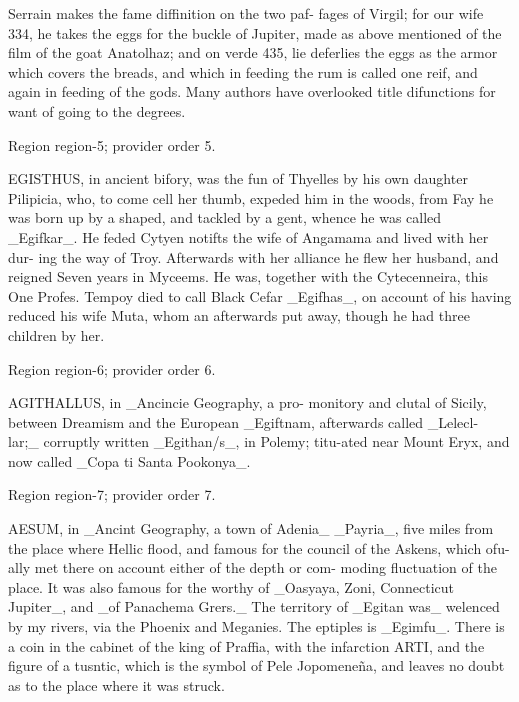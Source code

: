\documentclass[11pt]{article}
\begin{document}
Serrain makes the fame diffinition on the two paf- fages of Virgil; for our wife 334, he takes the eggs for the buckle of Jupiter, made as above mentioned of the film of the goat Anatolhaz; and on verde 435, lie deferlies the eggs as the armor which covers the breads, and which in feeding the rum is called one reif, and again in feeding of the gods. Many authors have overlooked title difunctions for want of going to the degrees.
\par

{\scriptsize\color{gray} Region region-5; provider order 5.\par}
\medskip

EGISTHUS, in ancient bifory, was the fun of Thyelles by his own daughter Pilipicia, who, to come cell her thumb, expeded him in the woods, from Fay he was born up by a shaped, and tackled by a gent, whence he was called \_Egifkar\_. He feded Cytyen notifts the wife of Angamama and lived with her dur- ing the way of Troy. Afterwards with her alliance he flew her husband, and reigned Seven years in Myceems. He was, together with the Cytecenneira, this One Profes. Tempoy died to call Black Cefar \_Egifhas\_, on account of his having reduced his wife Muta, whom an afterwards put away, though he had three children by her.
\par

{\scriptsize\color{gray} Region region-6; provider order 6.\par}
\medskip

AGITHALLUS, in \_Ancincie Geography, a pro- monitory and clutal of Sicily, between Dreamism and the European \_Egiftnam, afterwards called \_Lelecl- lar;\_ corruptly written \_Egithan/s\_, in Polemy; titu-ated near Mount Eryx, and now called \_Copa ti Santa Pookonya\_.
\par

{\scriptsize\color{gray} Region region-7; provider order 7.\par}
\medskip

AESUM, in \_Ancint Geography, a town of Adenia\_ \_Payria\_, five miles from the place where Hellic flood, and famous for the council of the Askens, which ofu- ally met there on account either of the depth or com- moding fluctuation of the place. It was also famous for the worthy of \_Oasyaya, Zoni, Connecticut Jupiter\_, and \_of Panachema Grers.\_ The territory of \_Egitan was\_ welenced by my rivers, via the Phoenix and Meganies. The eptiples is \_Egimfu\_. There is a coin in the cabinet of the king of Praffia, with the infarction ARTI, and the figure of a tusntic, which is the symbol of Pele Jopomeneña, and leaves no doubt as to the place where it was struck.
\par
\end{document}
